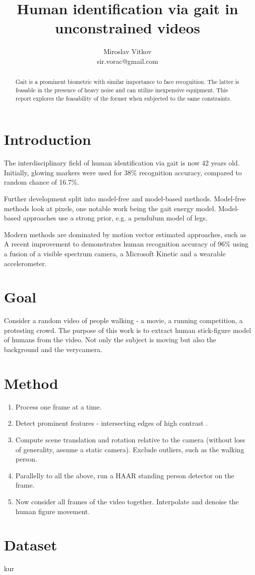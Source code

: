 \documentclass{article}
\title{Human identification via gait in unconstrained videos}
\author{Miroslav Vitkov \\ sir.vorac@gmail.com}
\begin{document}
\maketitle


\begin{abstract}
Gait is a prominent biometric with similar importance to face recognition.
The latter is feasable in the presence of heavy noise and can utilize inexpensive equipment.
This report explores the feasability of the former when subjected to the same constraints.
\end{abstract}


\section{Introduction}
The interdisciplinary field of human identification via gait is now 42 years old.
Initially, glowing markers were used\cite{begin} for 38\% recognition accuracy, compared to random chance of 16.7\%.

Further development split into model-free and model-based methods.
Model-free methods look at pixels, one notable work being the gait energy model\cite{energy}.
Model-based approaches use a strong prior, e.g. a pendulum model of legs\cite{pendulum}.

Modern methods are dominated by motion vector estimated approaches, such as \cite{pyramid}
A recent improvement to \cite{pyramid} demonstrates human recognition accuracy of 96\% using a fusion of a visible spectrum camera, a Microsoft Kinetic and a wearable accelerometer\cite{robust}.


\section{Goal}
Consider a random video of people walking - a movie, a running competition, a protesting crowd.
The purpose of this work is to extract human stick-figure model of humans from the video.
Not only the subject is moving but also the background and the verycamera.


\section{Method}
\begin{enumerate}
\item{Process one frame at a time.}
\item{Detect prominent features - intersecting edges of high contrast .}
\item{Compute scene translation and rotation relative to the camera (without loss of generality, assume a static camera). Exclude outliers, such as the walking person.}
\item{Parallelly to all the above, run a HAAR standing person detector on the frame.}
\item{Now consider all frames of the video together. Interpolate and denoise the human figure movement.}
\end{enumerate}


\section{Dataset}
kur\cite{largest}


\printbibliography
\end{document}
